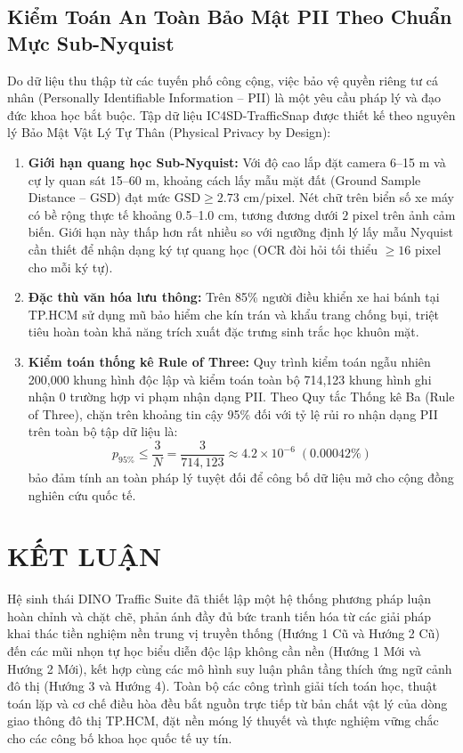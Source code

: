 \documentclass[11pt,a4paper]{article}
\begin{document}
\subsection{Kiểm Toán An Toàn Bảo Mật PII Theo Chuẩn Mực Sub-Nyquist}
Do dữ liệu thu thập từ các tuyến phố công cộng, việc bảo vệ quyền riêng tư cá nhân (Personally Identifiable Information -- PII) là một yêu cầu pháp lý và đạo đức khoa học bắt buộc. Tập dữ liệu IC4SD-TrafficSnap được thiết kế theo nguyên lý Bảo Mật Vật Lý Tự Thân (Physical Privacy by Design):
\begin{enumerate}
    \item \textbf{Giới hạn quang học Sub-Nyquist:} Với độ cao lắp đặt camera 6--15 m và cự ly quan sát 15--60 m, khoảng cách lấy mẫu mặt đất (Ground Sample Distance -- GSD) đạt mức $\text{GSD} \ge 2.73\text{ cm/pixel}$. Nét chữ trên biển số xe máy có bề rộng thực tế khoảng 0.5--1.0 cm, tương đương dưới $2\text{ pixel}$ trên ảnh cảm biến. Giới hạn này thấp hơn rất nhiều so với ngưỡng định lý lấy mẫu Nyquist cần thiết để nhận dạng ký tự quang học (OCR đòi hỏi tối thiểu $\ge 16\text{ pixel}$ cho mỗi ký tự).
    \item \textbf{Đặc thù văn hóa lưu thông:} Trên 85\% người điều khiển xe hai bánh tại TP.HCM sử dụng mũ bảo hiểm che kín trán và khẩu trang chống bụi, triệt tiêu hoàn toàn khả năng trích xuất đặc trưng sinh trắc học khuôn mặt.
    \item \textbf{Kiểm toán thống kê Rule of Three:} Quy trình kiểm toán ngẫu nhiên 200,000 khung hình độc lập và kiểm toán toàn bộ 714,123 khung hình ghi nhận 0 trường hợp vi phạm nhận dạng PII. Theo Quy tắc Thống kê Ba (Rule of Three), chặn trên khoảng tin cậy 95\% đối với tỷ lệ rủi ro nhận dạng PII trên toàn bộ tập dữ liệu là:
    \begin{equation}
        p_{95\%} \le \frac{3}{N} = \frac{3}{714,123} \approx 4.2 \times 10^{-6} \; (0.00042\%)
    \end{equation}
    bảo đảm tính an toàn pháp lý tuyệt đối để công bố dữ liệu mở cho cộng đồng nghiên cứu quốc tế.
\end{enumerate}

\section{KẾT LUẬN}
Hệ sinh thái DINO Traffic Suite đã thiết lập một hệ thống phương pháp luận hoàn chỉnh và chặt chẽ, phản ánh đầy đủ bức tranh tiến hóa từ các giải pháp khai thác tiền nghiệm nền trung vị truyền thống (Hướng 1 Cũ và Hướng 2 Cũ) đến các mũi nhọn tự học biểu diễn độc lập không cần nền (Hướng 1 Mới và Hướng 2 Mới), kết hợp cùng các mô hình suy luận phân tầng thích ứng ngữ cảnh đô thị (Hướng 3 và Hướng 4). Toàn bộ các công trình giải tích toán học, thuật toán lặp và cơ chế điều hòa đều bắt nguồn trực tiếp từ bản chất vật lý của dòng giao thông đô thị TP.HCM, đặt nền móng lý thuyết và thực nghiệm vững chắc cho các công bố khoa học quốc tế uy tín.
\end{document}
